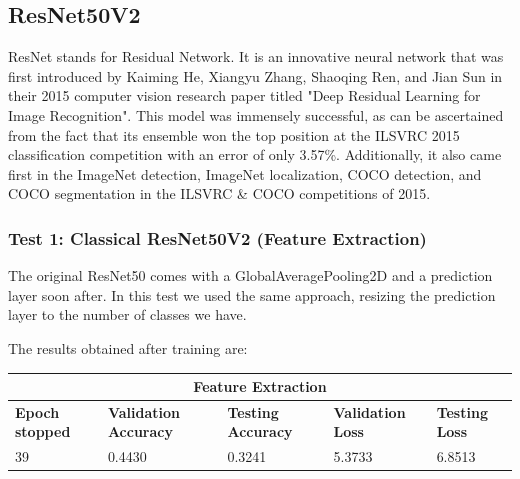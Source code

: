 \subsection{ResNet50V2}
ResNet stands for Residual Network. It is an innovative neural network that was first introduced by Kaiming He, Xiangyu Zhang, Shaoqing Ren, and Jian Sun in their 2015 computer vision research paper titled "Deep Residual Learning for Image Recognition". This model was immensely successful, as can be ascertained from the fact that its ensemble won the top position at the ILSVRC 2015 classification competition with an error of only 3.57\%. Additionally, it also came first in the ImageNet detection, ImageNet localization, COCO detection, and COCO segmentation in the ILSVRC \& COCO competitions of 2015.



\subsubsection{Test 1: Classical ResNet50V2 (Feature Extraction)}
The original ResNet50 comes with a GlobalAveragePooling2D and a prediction layer soon after. In this test we used the same approach, resizing the prediction layer to the number of classes we have.

\noindent The results obtained after training are:
\medskip

\begin{tabular}{ |p{2cm}|p{2cm}|p{2cm}|p{2cm}|p{2cm}|  }
\hline
\multicolumn{5}{|c|}{Feature Extraction} \\
\hline
\textbf{Epoch stopped} & \textbf{Validation Accuracy} & \textbf{Testing Accuracy} & \textbf{Validation Loss} & \textbf{Testing Loss} \\
\hline
39 & 0.4430 & 0.3241 & 5.3733 & 6.8513\\
\hline
\end{tabular}

